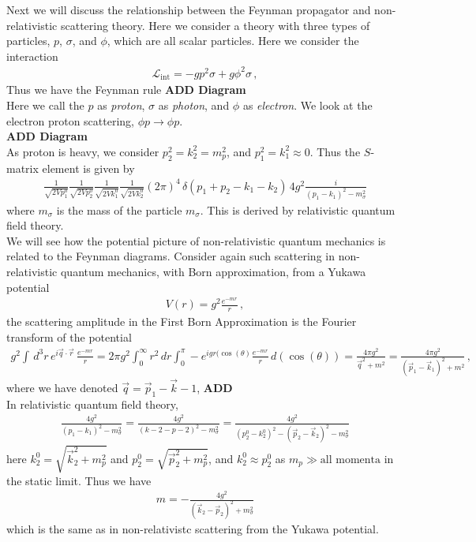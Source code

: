 \documentclass[11pt, onesided]{book}
\theoremstyle{break}
\theoremstyle{break}
\begin{document}
Next we will discuss the relationship between the Feynman propagator and non-relativistic scattering theory. Here we consider a theory with three types of particles, $p$, $\sigma$, and $\phi$, which are all scalar particles. Here we consider the interaction
\begin{align*}
\mathcal{L}_{\text{int}} = -g p^2 \sigma + g\phi^2 \sigma\,,
\end{align*}
Thus we have the Feynman rule \textbf{ADD Diagram}\\
Here we call the $p$ as \textit{proton}, $\sigma$ as \textit{photon}, and $\phi$ as \textit{electron}. We look at the electron proton scattering, $\phi p \to \phi p$.\\ 
\textbf{ADD Diagram}\\
As proton is heavy, we consider $p_2^2 = k_2^2 = m_p^2$, and $p_1^2 = k_1^2 \approx 0$. Thus the $S$-matrix element is given by
\begin{align*}
\frac{1}{\sqrt{2Vp_1^0}}\frac{1}{\sqrt{2Vp_2^0}}\frac{1}{\sqrt{2Vk_1^0}}\frac{1}{\sqrt{2Vk_2^0}} (2\pi)^4\, \delta(p_1 + p_2 - k_1 - k_2)\, 4g^2 \frac{i}{(p_1-k_1)^2 - m_\sigma^2}
\end{align*}
where $m_\sigma$ is the mass of the particle $m_\sigma$. This is derived by relativistic quantum field theory.\\

We will see how the potential picture of non-relativistic quantum mechanics is related to the Feynman diagrams. Consider again such scattering in non-relativistic quantum mechanics, with Born approximation, from a Yukawa potential
\begin{align*}
V(r) = g^2 \frac{e^{-mr}}{r}\,,
\end{align*}
the scattering amplitude in the First Born Approximation is the Fourier transform of the potential
\begin{align*}
g^2 \int \, d^3r \, e^{i \vec{q} \cdot \vec{r}}\, \frac{e^{-mr}}{r} = 2\pi g^2 \int_0^\infty r^2\, dr \int_0^\pi -e^{igr(\cos(\theta)}\frac{e^{-mr}}{r} \, d(\cos(\theta)) = \frac{4\pi g^2}{\vec{q}^2 + m^2} = \frac{4\pi g^2}{(\vec{p}_1 - \vec{k}_1)^2 + m^2} \,,
\end{align*}
where we have denoted $\vec{q} = \vec{p}_1 - \vec{k}-1$, \textbf{ADD}\\

In relativistic quantum field theory, 
\begin{align*}
\frac{4g^2}{(p_1-k_1)^2 - m_\sigma^2} = \frac{4g^2}{(k-2 - p-2)^2 - m_\sigma^2} = \frac{4g^2}{(p_2^0 - k_2^0)^2 - (\vec{p}_2 - \vec{k}_2)^2 - m_\sigma^2}
\end{align*}
here $k_2^0  = \sqrt{\vec{k}_2^2 + m_p^2}$ and $p_2^0 = \sqrt{\vec{p}_2^2 + m_p^2}$, and $k_2^0 \approx p_2^0$ as $m_p\gg \text{all momenta}$ in the static limit. Thus we have
\begin{align*}
m = -\frac{4g^2}{(\vec{k}_2 - \vec{p}_2)^2 + m_\sigma^2}
\end{align*}
which is the same as in non-relativistc scattering from the Yukawa potential. 
\end{document}
